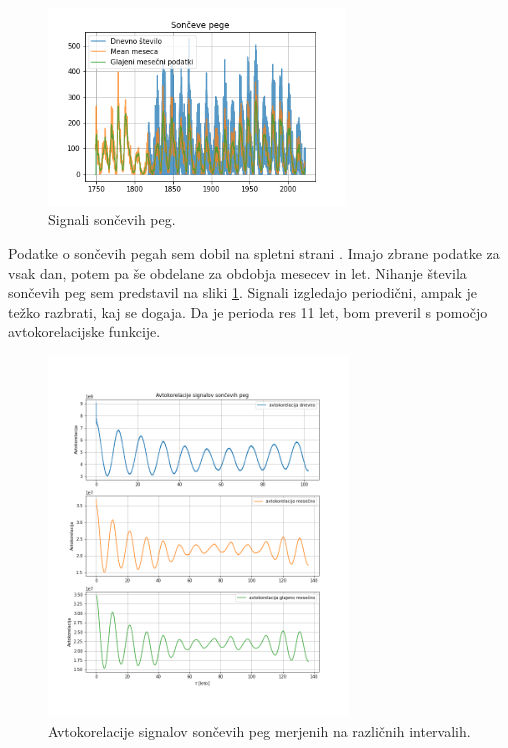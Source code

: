 \documentclass[a4paper, 12pt, slovene]{article}
\begin{document}
\begin{figure}[H]
\centering
\includegraphics[width=0.7\textwidth]{grafi/sunspots.png}
\caption{Signali sončevih peg.}
\label{f:sunspots}
\end{figure}

Podatke o sončevih pegah sem dobil na spletni strani \cite{soncne-pege}. Imajo zbrane podatke za vsak dan, potem pa še obdelane za obdobja mesecev in let. Nihanje števila sončevih peg sem predstavil na sliki \ref{f:sunspots}. Signali izgledajo periodični, ampak je težko razbrati, kaj se dogaja. Da je perioda res 11 let, bom preveril s pomočjo avtokorelacijske funkcije. 

\begin{figure}[H]
\centering
\includegraphics[width=0.71\textwidth]{grafi/avtokorelacija-sunspots.png}
\caption{Avtokorelacije signalov sončevih peg merjenih na različnih intervalih.}
\label{f:sunspots-autocorr}
\end{figure}
\end{document}
